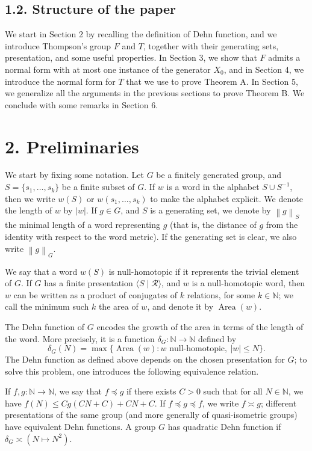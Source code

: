\documentclass[10pt,a4paper]{article}
\newcommand{\norm}[1]{\left\lVert#1\right\rVert}
\newcommand{\sourcepagenumber}{editorial cover}
\newcommand{\SourcePage}[1]{\clearpage\gdef\sourcepagenumber{#1}}
\begin{document}
\subsection*{1.2. Structure of the paper}
We start in Section 2 by recalling the definition of Dehn function, and we introduce Thompson's group $F$ and $T$, together with their generating sets, presentation, and some useful properties. In Section 3, we
\SourcePage{3}
\noindent show that $F$ admits a normal form with at most one instance of the generator $X_0$, and in Section 4, we introduce the normal form for $T$ that we use to prove Theorem A. In Section 5, we generalize all the arguments in the previous sections to prove Theorem B. We conclude with some remarks in Section 6.

\section*{2. Preliminaries}
We start by fixing some notation. Let $G$ be a finitely generated group, and $S=\{s_1,\ldots,s_k\}$ be a finite subset of $G$. If $w$ is a word in the alphabet $S\cup S^{-1}$, then we write $w(S)$ or $w(s_1,\ldots,s_k)$ to make the alphabet explicit. We denote the length of $w$ by $|w|$. If $g\in G$, and $S$ is a generating set, we denote by $\norm{g}_S$ the minimal length of a word representing $g$ (that is, the distance of $g$ from the identity with respect to the word metric). If the generating set is clear, we also write $\norm{g}_G$.

We say that a word $w(S)$ is null-homotopic if it represents the trivial element of $G$. If $G$ has a finite presentation $\langle S\mid\mathcal{R}\rangle$, and $w$ is a null-homotopic word, then $w$ can be written as a product of conjugates of $k$ relations, for some $k\in\mathbb{N}$; we call the minimum such $k$ the area of $w$, and denote it by $\operatorname{Area}(w)$.

The Dehn function of $G$ encodes the growth of the area in terms of the length of the word. More precisely, it is a function $\delta_G:\mathbb{N}\to\mathbb{N}$ defined by
\[
\delta_G(N)=\max\{\operatorname{Area}(w):w\text{ null-homotopic},\ |w|\le N\}.
\]
The Dehn function as defined above depends on the chosen presentation for $G$; to solve this problem, one introduces the following equivalence relation.

If $f,g:\mathbb{N}\to\mathbb{N}$, we say that $f\preccurlyeq g$ if there exists $C>0$ such that for all $N\in\mathbb{N}$, we have $f(N)\le Cg(CN+C)+CN+C$. If $f\preccurlyeq g\preccurlyeq f$, we write $f\asymp g$; different presentations of the same group (and more generally of quasi-isometric groups) have equivalent Dehn functions. A group $G$ has quadratic Dehn function if $\delta_G\asymp (N\mapsto N^2)$.
\end{document}

